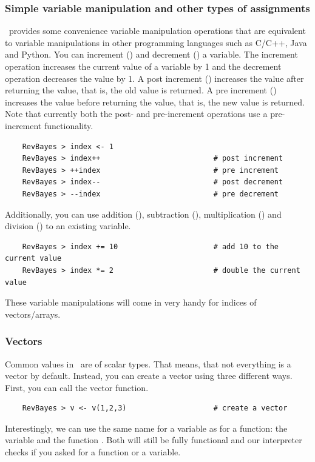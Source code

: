 \subsubsection*{Simple variable manipulation and other types of assignments}
\Rev~provides some convenience variable manipulation operations that are equivalent to variable manipulations in other programming languages such as C/C++, Java and Python.
You can increment (\cl{++}) and decrement (\cl{--}) a variable.
The increment operation increases the current value of a variable by 1 and the decrement operation decreases the value by 1.
A post increment () increases the value after returning the value, that is, the old value is returned.
A pre increment () increases the value before returning the value, that is, the new value is returned.
Note that currently both the post- and pre-increment operations use a pre-increment functionality.
{\tt \begin{snugshade*}
\begin{lstlisting}    
    RevBayes > index <- 1
    RevBayes > index++                          # post increment
    RevBayes > ++index                          # pre increment
    RevBayes > index--                          # post decrement
    RevBayes > --index                          # pre decrement
\end{lstlisting}
\end{snugshade*}}
Additionally, you can use addition (), subtraction (), multiplication () and division () to an existing variable.
{\tt \begin{snugshade*}
\begin{lstlisting}    
    RevBayes > index += 10                      # add 10 to the current value
    RevBayes > index *= 2                       # double the current value
\end{lstlisting}
\end{snugshade*}}
These variable manipulations will come in very handy for indices of vectors/arrays.

\subsubsection*{Vectors}
Common values in \RevBayes~are of scalar types.
That means, that not everything is a vector by default.
Instead, you can create a vector using three different ways.
First, you can call the vector function.
{\tt \begin{snugshade*}
\begin{lstlisting}    
    RevBayes > v <- v(1,2,3)                    # create a vector
\end{lstlisting}
\end{snugshade*}}
Interestingly, we can use the same name for a variable as for a function: the variable  and the function .
Both will still be fully functional and our interpreter checks if you asked for a function or a variable.

